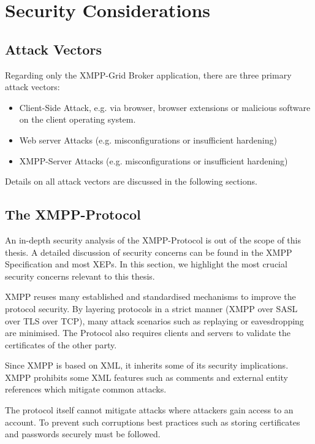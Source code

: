 \section{Security Considerations}

\subsection{Attack Vectors}

Regarding only the XMPP-Grid Broker application, there are three primary attack vectors:

\begin{itemize}
    \item Client-Side Attack, e.g. via browser, browser extensions or malicious software on the client operating system.
    \item Web server Attacks (e.g. misconfigurations or insufficient hardening)
    \item XMPP-Server Attacks (e.g. misconfigurations or insufficient hardening)
\end{itemize}

Details on all attack vectors are discussed in the following sections.

\subsection{The XMPP-Protocol}

An in-depth security analysis of the XMPP-Protocol is out of the scope of this thesis.
A detailed discussion of security concerns can be found in the XMPP Specification \cite{rfc6120} and most XEPs\cite{xep-00060}\cite{xep-00248}.
In this section, we highlight the most crucial security concerns relevant to this thesis.

XMPP reuses many established and standardised mechanisms to improve the protocol security.
By layering protocols in a strict manner (XMPP over SASL over TLS over TCP), many attack scenarios such as replaying or eavesdropping are minimised.
The Protocol also requires clients and servers to validate the certificates of the other party. \cite{rfc6120} 

Since XMPP is based on XML, it inherits some of its security implications.
XMPP prohibits some XML features such as comments and external entity references which mitigate common attacks. \cite{rfc6120} 

The protocol itself cannot mitigate attacks where attackers gain access to an account.
To prevent such corruptions best practices such as storing certificates and passwords securely must be followed.

